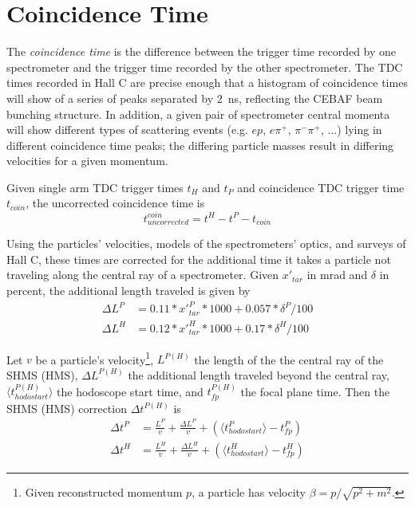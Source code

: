 \section{Coincidence Time}
The \textit{coincidence time} is the difference between the trigger time
recorded by one spectrometer and the trigger time recorded by the other
spectrometer.
The TDC times recorded in Hall C are precise enough that a histogram of
coincidence times will show of a series of peaks separated by
\SI{2}{\nano\second}, reflecting the CEBAF beam bunching structure.
In addition, a given pair of spectrometer central momenta will show different
types of scattering events (e.g. $ep$, $e\pi^+$, $\pi^-\pi^+$, ...) lying in
different coincidence time peaks; the differing particle masses result in
differing velocities for a given momentum.

Given single arm TDC trigger times $t_H$ and $t_P$ and coincidence TDC trigger
time $t_{coin}$, the uncorrected coincidence time is
\begin{equation}
    t^{coin}_{uncorrected} = t^H - t^P - t_{coin}
\end{equation}

Using the particles' velocities, models of the spectrometers' optics, and
surveys of Hall C, these times are corrected for the additional time it takes a
particle not traveling along the central ray of a spectrometer.
Given $x'_{tar}$ in \si{\milli\radian} and $\delta$ in percent, the additional
length traveled is given by
\begin{align}
    \Delta L^P &= 0.11 * x'^{P}_{tar} * 1000 + 0.057 * \delta^{P}/100 \\
    \Delta L^H &= 0.12 * x'^{H}_{tar}* 1000 + 0.17 * \delta^{H}/100
\end{align}

Let $v$ be a particle's velocity\footnote{Given reconstructed momentum $p$, a
 particle has velocity $\beta = p / \sqrt{p^2+m^2}$.},
$L^{P(H)}$ the length of the the central ray of the SHMS (HMS),
$\Delta L^{P(H)}$ the additional length traveled beyond the central ray,
$\langle t^{P(H)}_{hodostart}\rangle$ the hodoscope start time, and
$t^{P(H)}_{fp}$ the focal plane time.
Then the SHMS (HMS) correction $\Delta t^{P(H)}$ is
\begin{align}
    \Delta t^P &= \frac{L^P}{v} + \frac{\Delta L^P}{v} + \left( \langle t^{P}_{hodostart}\rangle - t^{P}_{fp} \right) \\
    \Delta t^H &= \frac{L^H}{v} + \frac{\Delta L^H}{v} + \left( \langle t^{H}_{hodostart}\rangle - t^{H}_{fp} \right)
\end{align}

